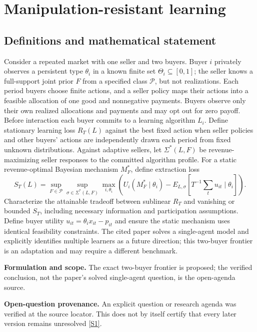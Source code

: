 \documentclass[11pt]{article}
\newcommand{\sref}[2]{\hyperlink{source:#1:#2}{[S#2]}}
\begin{document}
\section*{Manipulation-resistant learning}\label{30007569}
\subsection{Definitions and mathematical statement}
Consider a repeated market with one seller and two buyers. Buyer \(i\) privately observes a persistent type \(\theta_i\) in a known finite set \(\Theta_i\subseteq[0,1]\); the seller knows a full-support joint prior \(F\) from a specified class \(\mathcal P\), but not realizations. Each period buyers choose finite actions, and a seller policy maps their actions into a feasible allocation of one good and nonnegative payments. Buyers observe only their own realized allocations and payments and may opt out for zero payoff. Before interaction each buyer commits to a learning algorithm \(L_i\). Define stationary learning loss \(R_T(L)\) against the best fixed action when seller policies and other buyers’ actions are independently drawn each period from fixed unknown distributions. Against adaptive sellers, let \(\Sigma^*(L,F)\) be revenue-maximizing seller responses to the committed algorithm profile. For a static revenue-optimal Bayesian mechanism \(M_F^*\), define extraction loss
\[
 S_T(L)=\sup_{F\in\mathcal P}\sup_{\sigma\in\Sigma^*(L,F)}\max_{i,\theta_i}
 \left(U_i(M_F^*\mid\theta_i)-E_{L,\sigma}[T^{-1}\textstyle\sum_t u_{it}\mid\theta_i]\right).
\]
Characterize the attainable tradeoff between sublinear \(R_T\) and vanishing or bounded \(S_T\), including necessary information and participation assumptions. Define buyer utility \(u_{it}=\theta_i x_{it}-p_{it}\) and ensure the static mechanism uses identical feasibility constraints. The cited paper solves a single-agent model and explicitly identifies multiple learners as a future direction; this two-buyer frontier is an adaptation and may require a different benchmark.

\par\textbf{Formulation and scope.} The exact two-buyer frontier is proposed; the verified conclusion, not the paper’s solved single-agent question, is the open-agenda source.

\par\textbf{Open-question provenance.} An explicit question or research agenda was verified at the source locator. This does not by itself certify that every later version remains unresolved \sref{30007569}{1}.
\end{document}
